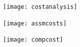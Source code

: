 \documentclass{article}
\begin{document}
\begin{appendices}
	

\begin{figure}[H]
	\centering
	\caption[NRE Costs]{}
	\label{fig:costanalysis}
	\texttt{[image: costanalysis]}
\end{figure}

\begin{figure}[H]
	\centering
	\caption[Assembly Costs]{}
	\label{fig:assmcosts}
	\texttt{[image: assmcosts]}
\end{figure}

\begin{figure}[H]
	\centering
	\caption[Component Costs]{}
	\label{fig:compcost}
	\texttt{[image: compcost]}
\end{figure}

\end{appendices}

\end{document}
